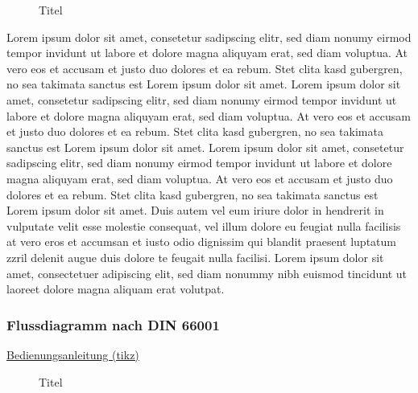 \par\medskip
\begin{wrapfigure}[11]{r}[0pt]{5cm}
    \centering
    \caption[Titel in Abbildungsverzeichnis (wrapfig)]{Titel\footnotemark}
    \label{fig:ExampleFloatImage}
\end{wrapfigure}
Lorem ipsum dolor sit amet, consetetur sadipscing elitr, sed diam nonumy eirmod tempor invidunt ut labore et dolore magna aliquyam erat, sed diam voluptua. At vero eos et accusam et justo duo dolores et ea rebum. Stet clita kasd gubergren, no sea takimata sanctus est Lorem ipsum dolor sit amet. Lorem ipsum dolor sit amet, consetetur sadipscing elitr, sed diam nonumy eirmod tempor invidunt ut labore et dolore magna aliquyam erat, sed diam voluptua. At vero eos et accusam et justo duo dolores et ea rebum. Stet clita kasd gubergren, no sea takimata sanctus est Lorem ipsum dolor sit amet. Lorem ipsum dolor sit amet, consetetur sadipscing elitr, sed diam nonumy eirmod tempor invidunt ut labore et dolore magna aliquyam erat, sed diam voluptua. At vero eos et accusam et justo duo dolores et ea rebum. Stet clita kasd gubergren, no sea takimata sanctus est Lorem ipsum dolor sit amet.
Duis autem vel eum iriure dolor in hendrerit in vulputate velit esse molestie consequat, vel illum dolore eu feugiat nulla facilisis at vero eros et accumsan et iusto odio dignissim qui blandit praesent luptatum zzril delenit augue duis dolore te feugait nulla facilisi. Lorem ipsum dolor sit amet, consectetuer adipiscing elit, sed diam nonummy nibh euismod tincidunt ut laoreet dolore magna aliquam erat volutpat.
\newpage

\subsubsection{Flussdiagramm nach DIN 66001}

\href{https://tikz.dev/}{Bedienungsanleitung (tikz)}

\par\medskip
\begin{figure}[!ht]
  \centering
  \caption[Titel in Abbildungsverzeichnis(Flowchart)]{Titel}
  \label{fig:ExampleFlowchart}
\end{figure}
\newpage

